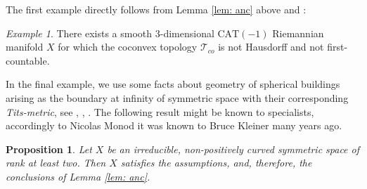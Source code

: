 \documentclass[12pt,leqno]{amsart}
\numberwithin{equation}{section}
\newtheorem{prop}[thm]{Proposition}
\theoremstyle{remark}
\newtheorem{ex}[thm]{Example}
\newcommand{\CAT}{\mathrm{CAT}}
\begin{document}
The first example directly follows from
Lemma \ref{lem: anc} above and \cite[Theorem B, Corollary C]{Ancona}:

\begin{ex} \label{ex: anc}
There exists a smooth $3$-dimensional $\CAT(-1)$ Riemannian manifold $X$ for which the coconvex topology $\mathcal T_{co}$ is not Hausdorff and not first-countable.
\end{ex}

In the final example, we  use some facts about geometry of spherical buildings arising as the boundary at infinity of symmetric space with their corresponding \emph{Tits-metric}, see  \cite{KleinerLeeb}, \cite{KleinerLeeb1}, \cite{Kap}.  The following result might be known to specialists, accordingly to Nicolas Monod it was known to Bruce Kleiner many years ago. 

\begin{prop}
Let $X$ be an irreducible, non-positively curved symmetric space of rank at least two. Then $X$ satisfies the assumptions, and, therefore, the conclusions of Lemma \ref{lem: anc}. 
\end{prop}
\end{document}
